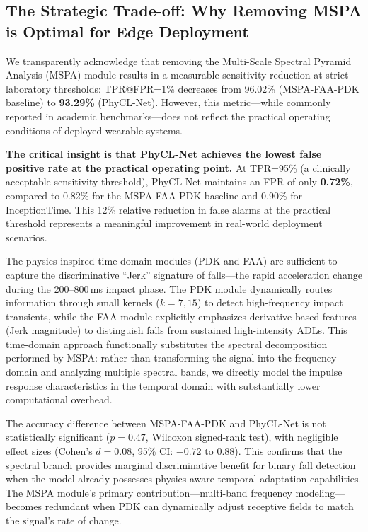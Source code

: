 \documentclass{article}
\begin{document}
\subsection{The Strategic Trade-off: Why Removing MSPA is Optimal for Edge Deployment}

We transparently acknowledge that removing the Multi-Scale Spectral Pyramid Analysis (MSPA) module results in a measurable sensitivity reduction at strict laboratory thresholds: TPR@FPR=1\% decreases from 96.02\% (MSPA-FAA-PDK baseline) to \textbf{93.29\%} (PhyCL-Net). However, this metric---while commonly reported in academic benchmarks---does not reflect the practical operating conditions of deployed wearable systems.

\textbf{The critical insight is that PhyCL-Net achieves the lowest false positive rate at the practical operating point.} At TPR=95\% (a clinically acceptable sensitivity threshold), PhyCL-Net maintains an FPR of only \textbf{0.72\%}, compared to 0.82\% for the MSPA-FAA-PDK baseline and 0.90\% for InceptionTime. This 12\% relative reduction in false alarms at the practical threshold represents a meaningful improvement in real-world deployment scenarios.

The physics-inspired time-domain modules (PDK and FAA) are sufficient to capture the discriminative ``Jerk'' signature of falls---the rapid acceleration change during the 200--800\,ms impact phase. The PDK module dynamically routes information through small kernels ($k=7, 15$) to detect high-frequency impact transients, while the FAA module explicitly emphasizes derivative-based features (Jerk magnitude) to distinguish falls from sustained high-intensity ADLs. This time-domain approach functionally substitutes the spectral decomposition performed by MSPA: rather than transforming the signal into the frequency domain and analyzing multiple spectral bands, we directly model the impulse response characteristics in the temporal domain with substantially lower computational overhead.

The accuracy difference between MSPA-FAA-PDK and PhyCL-Net is not statistically significant ($p=0.47$, Wilcoxon signed-rank test), with negligible effect sizes (Cohen's $d=0.08$, 95\% CI: $-0.72$ to $0.88$). This confirms that the spectral branch provides marginal discriminative benefit for binary fall detection when the model already possesses physics-aware temporal adaptation capabilities. The MSPA module's primary contribution---multi-band frequency modeling---becomes redundant when PDK can dynamically adjust receptive fields to match the signal's rate of change.
\end{document}
